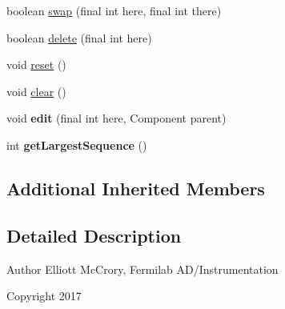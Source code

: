 \begin{DoxyCompactItemize}
\item 
boolean \hyperlink{classgov_1_1fnal_1_1ppd_1_1dd_1_1channel_1_1list_1_1table_1_1SelectedChannelsTableModel_a425682e41f6884211eeb8ac282aa20f6}{swap} (final int here, final int there)
\item 
boolean \hyperlink{classgov_1_1fnal_1_1ppd_1_1dd_1_1channel_1_1list_1_1table_1_1SelectedChannelsTableModel_ae93a046a5d3de36330302e02eb77e268}{delete} (final int here)
\item 
void \hyperlink{classgov_1_1fnal_1_1ppd_1_1dd_1_1channel_1_1list_1_1table_1_1SelectedChannelsTableModel_a18eb0afcee7ec9e06cab673fc5a9e83b}{reset} ()
\item 
void \hyperlink{classgov_1_1fnal_1_1ppd_1_1dd_1_1channel_1_1list_1_1table_1_1SelectedChannelsTableModel_a4827bcdd9d9c6287a9cde8abec7cb082}{clear} ()
\item 
\hypertarget{classgov_1_1fnal_1_1ppd_1_1dd_1_1channel_1_1list_1_1table_1_1SelectedChannelsTableModel_a260df7c33ba7603f5b61de9fd6460a96}{void {\bfseries edit} (final int here, Component parent)}\label{classgov_1_1fnal_1_1ppd_1_1dd_1_1channel_1_1list_1_1table_1_1SelectedChannelsTableModel_a260df7c33ba7603f5b61de9fd6460a96}

\item 
\hypertarget{classgov_1_1fnal_1_1ppd_1_1dd_1_1channel_1_1list_1_1table_1_1SelectedChannelsTableModel_a587affc6a89dab0a167a6eba68623314}{int {\bfseries get\-Largest\-Sequence} ()}\label{classgov_1_1fnal_1_1ppd_1_1dd_1_1channel_1_1list_1_1table_1_1SelectedChannelsTableModel_a587affc6a89dab0a167a6eba68623314}

\end{DoxyCompactItemize}
\subsection*{Additional Inherited Members}


\subsection{Detailed Description}
\begin{DoxyAuthor}{Author}
Elliott Mc\-Crory, Fermilab A\-D/\-Instrumentation 
\end{DoxyAuthor}
\begin{DoxyCopyright}{Copyright}
2017 
\end{DoxyCopyright}


